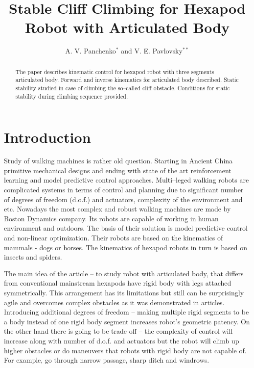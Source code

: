 \documentclass{ws-procs9x6}
\begin{document}
\title{Stable Cliff Climbing for Hexapod Robot with Articulated Body}

\author{A. V. Panchenko$^*$ and V. E. Pavlovsky$^{**}$}

\address{Faculty of Mechanics and Mathematics, Lomonosov Moscow State University,\\
Moscow, 119991, Russia\\
$^*$E-mail: PanchenkoAV@vap.ru\\
$^{**}$E-mail: vlpavl@mail.ru}

\begin{abstract}
The paper describes kinematic control for hexapod robot with three segments articulated body. Forward and inverse kinematics for articulated body described. Static stability studied in case of climbing the so--called cliff obstacle. Conditions for static stability during climbing sequence provided.
\end{abstract}


\bodymatter

\section{Introduction}\label{aba:intoduction}
Study of walking machines is rather old question. Starting in 
Ancient China primitive mechanical designs\cite{yan2005historical} and ending with state of the art reinforcement learning \cite{peng2017deeploco} and model predictive control approaches\cite{diedam2008online}. Multi--leged walking robots are complicated systems in terms of control and planning due to significant number of degrees of freedom (d.o.f.) and actuators, complexity of the environment and etc. Nowadays the most complex and robust walking machines are made by Boston Dynamics company\cite{raibert2008bigdog}. Its robots are capable of working in human environment and outdoors. The basis of their solution is model predictive control and non-linear optimization. Their robots are based on the kinematics of mammals - dogs or horses. The kinematics of hexapod robots in turn is based on insects and spiders.

The main idea of the article – to study robot with articulated body, that differs from conventional mainstream hexapods have rigid body with legs attached symmetrically. This arrangement has its limitations but still can be surprisingly agile and overcomes complex obstacles as it was demonstrated in articles\cite{golubev2008control,golubev2009motion,golubev2013motion}. Introducing additional degrees of freedom – making multiple rigid segments to be a body instead of one rigid body segment increases robot’s geometric patency. On the other hand there is going to be trade off – the complexity of control will increase\cite{panchenko2016control} along with number of d.o.f. and actuators but the robot will climb up higher obstacles or do maneuvers that robots with rigid body are not capable of. For example, go through narrow passage, sharp ditch and windrows.
\end{document}
